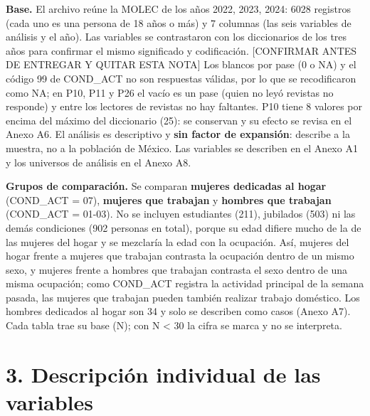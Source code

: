 \documentclass[
  spanish,
  12pt,
]{extarticle}
\begin{document}
\textbf{Base.} El archivo reúne la MOLEC de los años 2022, 2023, 2024:
6028 registros (cada uno es una persona de 18 años o más) y 7 columnas
(las seis variables de análisis y el año). Las variables se contrastaron
con los diccionarios de los tres años para confirmar el mismo
significado y codificación. {[}CONFIRMAR ANTES DE ENTREGAR Y QUITAR ESTA
NOTA{]} Los blancos por pase (0 o NA) y el código 99 de COND\_ACT no son
respuestas válidas, por lo que se recodificaron como NA; en P10, P11 y
P26 el vacío es un pase (quien no leyó revistas no responde) y entre los
lectores de revistas no hay faltantes. P10 tiene 8 valores por encima
del máximo del diccionario (25): se conservan y su efecto se revisa en
el Anexo A6. El análisis es descriptivo y \textbf{sin factor de
expansión}: describe a la muestra, no a la población de México. Las
variables se describen en el Anexo A1 y los universos de análisis en el
Anexo A8.

\textbf{Grupos de comparación.} Se comparan \textbf{mujeres dedicadas al
hogar} (COND\_ACT = 07), \textbf{mujeres que trabajan} y \textbf{hombres
que trabajan} (COND\_ACT = 01-03). No se incluyen estudiantes (211),
jubilados (503) ni las demás condiciones (902 personas en total), porque
su edad difiere mucho de la de las mujeres del hogar y se mezclaría la
edad con la ocupación. Así, mujeres del hogar frente a mujeres que
trabajan contrasta la ocupación dentro de un mismo sexo, y mujeres
frente a hombres que trabajan contrasta el sexo dentro de una misma
ocupación; como COND\_ACT registra la actividad principal de la semana
pasada, las mujeres que trabajan pueden también realizar trabajo
doméstico. Los hombres dedicados al hogar son 34 y solo se describen
como casos (Anexo A7). Cada tabla trae su base (N); con N \textless{} 30
la cifra se marca y no se interpreta.

\section{3. Descripción individual de las
variables}\label{descripciuxf3n-individual-de-las-variables}
\end{document}

